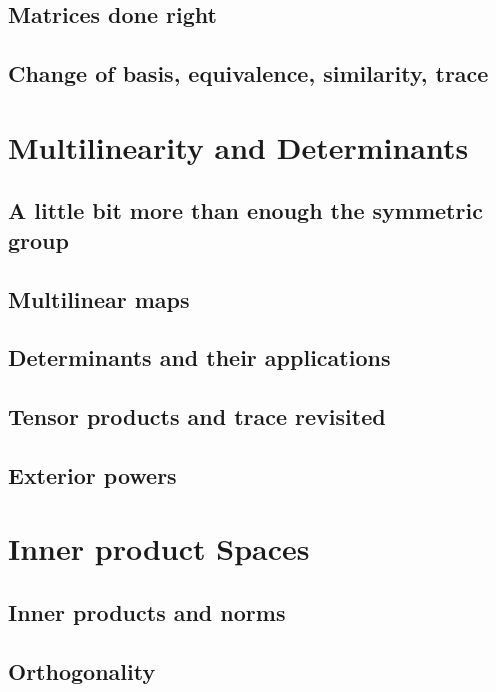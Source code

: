 \documentclass{book}
\theoremstyle{plain}
\theoremstyle{definition}
\theoremstyle{remark}
\begin{document}
\section{Matrices done right}

\section{Change of basis, equivalence, similarity, trace}

\chapter{Multilinearity and Determinants} \label{chapter_multilinear}

\section{A little bit more than enough the symmetric group}

\section{Multilinear maps}

\section{Determinants and their applications}

\section{Tensor products and trace revisited}

\section{Exterior powers}

\chapter{Inner product Spaces}

\section{Inner products and norms}

\section{Orthogonality}
\end{document}
